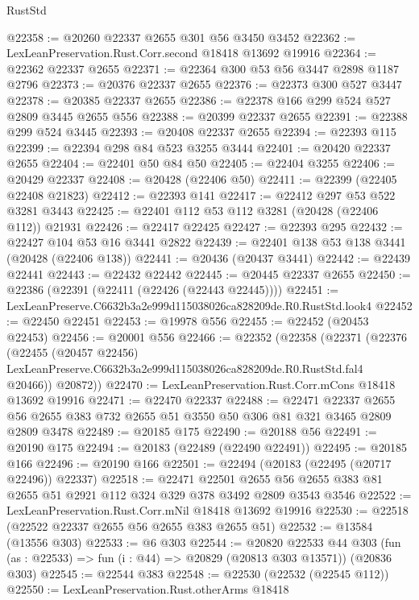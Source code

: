 \begin{lexlean}{RustStd}
\begin{coremodule}
@22358 := @20260 @22337 @2655 @301 @56 @3450 @3452
@22362 := LexLeanPreservation.Rust.Corr.second @18418 @13692 @19916
@22364 := @22362 @22337 @2655
@22371 := @22364 @300 @53 @56 @3447 @2898 @1187 @2796
@22373 := @20376 @22337 @2655
@22376 := @22373 @300 @527 @3447
@22378 := @20385 @22337 @2655
@22386 := @22378 @166 @299 @524 @527 @2809 @3445 @2655 @556
@22388 := @20399 @22337 @2655
@22391 := @22388 @299 @524 @3445
@22393 := @20408 @22337 @2655
@22394 := @22393 @115
@22399 := @22394 @298 @84 @523 @3255 @3444
@22401 := @20420 @22337 @2655
@22404 := @22401 @50 @84 @50
@22405 := @22404 @3255
@22406 := @20429 @22337
@22408 := @20428 (@22406 @50)
@22411 := @22399 (@22405 @22408 @21823)
@22412 := @22393 @141
@22417 := @22412 @297 @53 @522 @3281 @3443
@22425 := @22401 @112 @53 @112 @3281 (@20428 (@22406 @112)) @21931
@22426 := @22417 @22425
@22427 := @22393 @295
@22432 := @22427 @104 @53 @16 @3441 @2822
@22439 := @22401 @138 @53 @138 @3441 (@20428 (@22406 @138))
@22441 := @20436 (@20437 @3441)
@22442 := @22439 @22441
@22443 := @22432 @22442
@22445 := @20445 @22337 @2655
@22450 := @22386 (@22391 (@22411 (@22426 (@22443 @22445))))
@22451 := LexLeanPreserve.C6632b3a2e999d115038026ca828209de.R0.RustStd.look4
@22452 := @22450 @22451
@22453 := @19978 @556
@22455 := @22452 (@20453 @22453)
@22456 := @20001 @556
@22466 := @22352
    (@22358
      (@22371
        (@22376
          (@22455
            (@20457 @22456)
            LexLeanPreserve.C6632b3a2e999d115038026ca828209de.R0.RustStd.fal4
            @20466))
        @20872))
@22470 := LexLeanPreservation.Rust.Corr.mCons @18418 @13692 @19916
@22471 := @22470 @22337
@22488 := @22471
    @22337
    @2655
    @56
    @2655
    @383
    @732
    @2655
    @51
    @3550
    @50
    @306
    @81
    @321
    @3465
    @2809
    @2809
    @3478
@22489 := @20185 @175
@22490 := @20188 @56
@22491 := @20190 @175
@22494 := @20183 (@22489 (@22490 @22491))
@22495 := @20185 @166
@22496 := @20190 @166
@22501 := @22494 (@20183 (@22495 (@20717 @22496)) @22337)
@22518 := @22471
    @22501
    @2655
    @56
    @2655
    @383
    @81
    @2655
    @51
    @2921
    @112
    @324
    @329
    @378
    @3492
    @2809
    @3543
    @3546
@22522 := LexLeanPreservation.Rust.Corr.mNil @18418 @13692 @19916
@22530 := @22518 (@22522 @22337 @2655 @56 @2655 @383 @2655 @51)
@22532 := @13584 (@13556 @303)
@22533 := @6 @303
@22544 := @20820
    @22533
    @44
    @303
    (fun (as : @22533) => fun (i : @44) => @20829 (@20813 @303 @13571))
    (@20836 @303)
@22545 := @22544 @383
@22548 := @22530 (@22532 (@22545 @112))
@22550 := LexLeanPreservation.Rust.otherArms @18418

\end{coremodule}
\end{lexlean}
